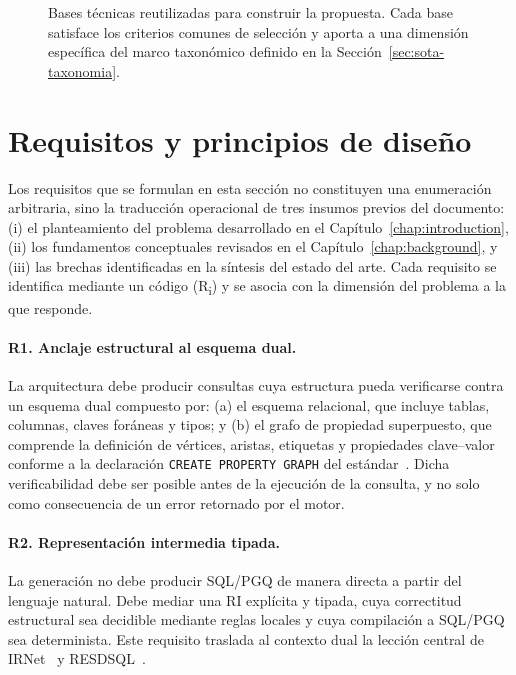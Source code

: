 \begin{figure}[htb]
    \centering
    
    \caption{Bases técnicas reutilizadas para construir la propuesta. Cada base satisface los criterios comunes de selección y aporta a una dimensión específica del marco taxonómico definido en la Sección~\ref{sec:sota-taxonomia}.}
    \label{fig:prop-bases}
\end{figure}


\section{Requisitos y principios de diseño}
\label{sec:prop-requisitos}

Los requisitos que se formulan en esta sección no constituyen una enumeración %
arbitraria, sino la traducción operacional de tres insumos previos del
documento: (i) el planteamiento del problema desarrollado en el
Capítulo~\ref{chap:introduction}, (ii) los fundamentos conceptuales revisados
en el Capítulo~\ref{chap:background}, y (iii) las brechas identificadas en la
síntesis del estado del arte. Cada requisito se identifica mediante un código
(R\textsubscript{i}) y se asocia con la dimensión del problema a la que
responde.

\paragraph{R1. Anclaje estructural al esquema dual.} La arquitectura debe
producir consultas cuya estructura pueda verificarse contra un esquema dual
compuesto por: (a) el esquema relacional, que incluye tablas, columnas, claves
foráneas y tipos; y (b) el grafo de propiedad superpuesto, que comprende la
definición de vértices, aristas, etiquetas y propiedades clave--valor conforme
a la declaración \texttt{CREATE PROPERTY GRAPH} del
estándar~\cite{ISO9075_16_2023, DuckPGQ}. Dicha verificabilidad debe ser
posible antes de la ejecución de la consulta, y no solo como consecuencia de
un error retornado por el motor.

\paragraph{R2. Representación intermedia tipada.} La generación no debe
producir \ac{SQL}/\ac{PGQ} de manera directa a partir del lenguaje natural.
Debe mediar una \ac{RI} explícita y tipada, cuya correctitud estructural sea
decidible mediante reglas locales y cuya compilación a \ac{SQL}/\ac{PGQ} sea
determinista. Este requisito traslada al contexto dual la lección central de
IRNet~\cite{guo2019irnet} y RESDSQL~\cite{RESDSQL2023}.

